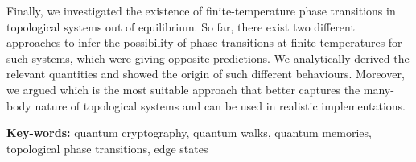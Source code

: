 Finally, we investigated the existence of finite-temperature phase transitions in topological systems out of equilibrium. So far, there exist two different approaches to infer the possibility of phase transitions  at finite temperatures for such systems, which were giving opposite predictions. We analytically derived the relevant quantities and showed the origin of such different behaviours. Moreover, we argued which is the most suitable approach that better captures the many-body nature of topological systems and can be used in realistic implementations.

\vfill

\begin{flushleft}
\textbf{Key-words:} quantum cryptography, quantum walks, quantum memories, topological phase transitions,  edge states
\end{flushleft}
